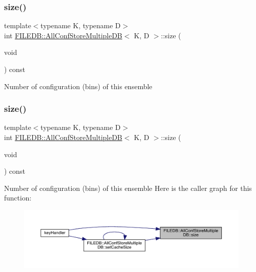 \subsubsection{\texorpdfstring{size()}{size()}\hspace{0.1cm}{\footnotesize\ttfamily [2/3]}}
{\footnotesize\ttfamily template$<$typename K, typename D$>$ \\
int \mbox{\hyperlink{classFILEDB_1_1AllConfStoreMultipleDB}{F\+I\+L\+E\+D\+B\+::\+All\+Conf\+Store\+Multiple\+DB}}$<$ K, D $>$\+::size (\begin{DoxyParamCaption}\item[{void}]{ }\end{DoxyParamCaption}) const\hspace{0.3cm}{\ttfamily [inline]}}

Number of configuration (bins) of this ensemble \mbox{\label{classFILEDB_1_1AllConfStoreMultipleDB_af05105b1ffe17093556a209ac9db1ed9}} 
\subsubsection{\texorpdfstring{size()}{size()}\hspace{0.1cm}{\footnotesize\ttfamily [3/3]}}
{\footnotesize\ttfamily template$<$typename K, typename D$>$ \\
int \mbox{\hyperlink{classFILEDB_1_1AllConfStoreMultipleDB}{F\+I\+L\+E\+D\+B\+::\+All\+Conf\+Store\+Multiple\+DB}}$<$ K, D $>$\+::size (\begin{DoxyParamCaption}\item[{void}]{ }\end{DoxyParamCaption}) const\hspace{0.3cm}{\ttfamily [inline]}}

Number of configuration (bins) of this ensemble Here is the caller graph for this function\+:
\nopagebreak
\begin{figure}[H]
\begin{center}
\leavevmode
\includegraphics[width=350pt]{d5/dbe/classFILEDB_1_1AllConfStoreMultipleDB_af05105b1ffe17093556a209ac9db1ed9_icgraph}
\end{center}
\end{figure}


